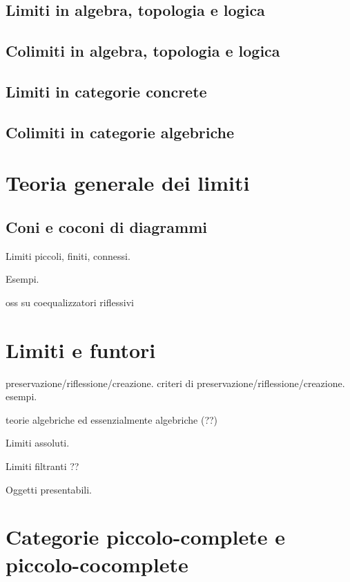 \subsection{Limiti in algebra, topologia e logica}
\subsection{Colimiti in algebra, topologia e logica}
\subsection{Limiti in categorie concrete}
\subsection{Colimiti in categorie algebriche}
\begin{esercizi}
	\item
	\item
	\item
	\item
	\item
\end{esercizi}

\section{Teoria generale dei limiti}
\subsection{Coni e coconi di diagrammi}
Limiti piccoli, finiti, connessi.

Esempi.


oss su coequalizzatori riflessivi



\section{Limiti e funtori} 

preservazione/riflessione/creazione. criteri di preservazione/riflessione/creazione. esempi. 

teorie algebriche ed essenzialmente algebriche (??)

Limiti assoluti.

Limiti filtranti ??

Oggetti presentabili.

\section{Categorie piccolo-complete e piccolo-cocomplete}

